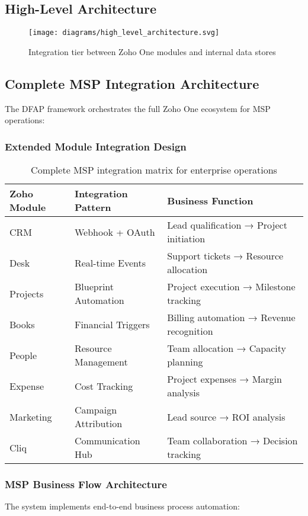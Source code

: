 \subsection{High-Level Architecture}
\begin{figure}[h]
  \centering
  \texttt{[image: diagrams/high\_level\_architecture.svg]}
  \caption{Integration tier between Zoho One modules and internal data stores}
\end{figure} 

\subsection{Complete MSP Integration Architecture}

The DFAP framework orchestrates the full Zoho One ecosystem for MSP operations:

\subsubsection{Extended Module Integration Design}
\begin{table}[h]
\centering
\begin{tabular}{|l|l|l|}
\hline
\textbf{Zoho Module} & \textbf{Integration Pattern} & \textbf{Business Function} \\
\hline
CRM & Webhook + OAuth & Lead qualification → Project initiation \\
\hline
Desk & Real-time Events & Support tickets → Resource allocation \\
\hline
Projects & Blueprint Automation & Project execution → Milestone tracking \\
\hline
Books & Financial Triggers & Billing automation → Revenue recognition \\
\hline
People & Resource Management & Team allocation → Capacity planning \\
\hline
Expense & Cost Tracking & Project expenses → Margin analysis \\
\hline
Marketing & Campaign Attribution & Lead source → ROI analysis \\
\hline
Cliq & Communication Hub & Team collaboration → Decision tracking \\
\hline
\end{tabular}
\caption{Complete MSP integration matrix for enterprise operations}
\end{table}

\subsubsection{MSP Business Flow Architecture}
The system implements end-to-end business process automation:

